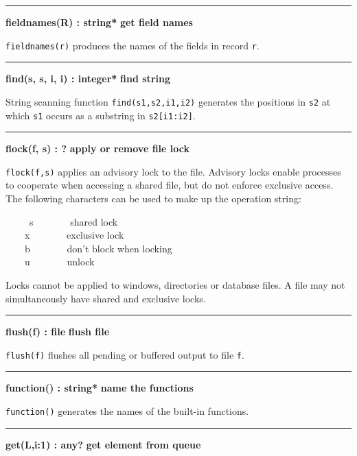 \bigskip\hrule\vspace{0.1cm}
\noindent
{\bf fieldnames(R) : string* } \hfill {\bf get field names}

\noindent
{}\texttt{fieldnames(r)} produces the names of the fields in
record \texttt{r}.

\bigskip\hrule\vspace{0.1cm}
\noindent
{\bf find(s, s, i, i) : integer* } \hfill {\bf find string}

\noindent
{}String scanning function \texttt{find(s1,s2,i1,i2)} generates
the positions in \texttt{s2} at which \texttt{s1} occurs as a
substring in \texttt{s2[i1:i2]}.

\bigskip\hrule\vspace{0.1cm}
\noindent
{\bf flock(f, s) : ? } \hfill {\bf apply or remove file lock}\WarningNotThreadSafe

\noindent
{}\texttt{flock(f,s)} applies an advisory
lock to the file. Advisory locks enable processes to
cooperate when accessing a shared file, but do not enforce exclusive
access. The following characters can be used to make up the operation
string: 

\ \ \ \ \ s \ \ \ \ \ \ \ shared lock\\
 \ \ \ \ x \ \ \ \ \ \ \ exclusive lock\\
 \ \ \ \ b \ \ \ \ \ \ \ don't block when
locking\\
 \ \ \ \ u \ \ \ \ \ \ \ unlock 

Locks cannot be applied to windows, directories or database files. A
file may not simultaneously have shared and exclusive locks.

\bigskip\hrule\vspace{0.1cm}
\noindent
{\bf flush(f) : file } \hfill {\bf flush file}

\noindent
{}\texttt{flush(f)} flushes all pending or buffered output
to file \texttt{f}.

\bigskip\hrule\vspace{0.1cm}
\noindent
{\bf function() : string* } \hfill {\bf name the functions}

\noindent
\texttt{function()} generates the names of the built-in functions.

\bigskip\hrule\vspace{0.1cm}
\noindent
{\bf get(L,i:1) : any? } \hfill {\bf get element from queue}\WarningNotThreadSafe


